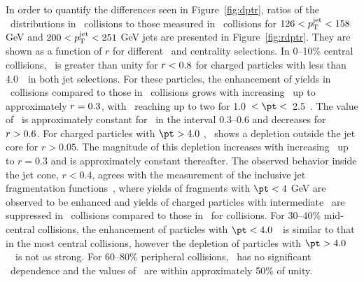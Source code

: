 In order to quantify the differences seen in Figure~\ref{fig:dptr}, ratios of the \Dptr\ distributions in \pbpb\ collisions
to those measured in \pp\ collisions for $126 < \mbox{$p_{\mathrm{T}}^{\mathrm{jet}}$} < 158$ GeV and $200 < \mbox{$p_{\mathrm{T}}^{\mathrm{jet}}$} < 251$ GeV jets 
are presented in Figure~\ref{fig:rdptr}. They are shown as a function of $r$ for different \pt\ and centrality selections. In 0--10\% central collisions,
\RDptr\ is greater than unity for $\mbox{$r$} < 0.8$ for charged particles with \pT less than 4.0~\GeV\ in both jet selections. 
For these particles, the enhancement of yields in \pbpb\ collisions compared to those in  \pp\ 
collisions grows with increasing \rvar\ up to approximately \mbox{$\mbox{$r$}  = 0.3$}, with \RDptr\ reaching up to two for
1.0~$< \pt <$~2.5~\GeV.
The value of \RDptr\ is approximately constant for \rvar\ in the interval \mbox{0.3--0.6} and decreases for \mbox{$\mbox{$r$} > 0.6$}.  For charged particles with $\pt > 4.0$ \GeV, \RDptr\ shows a depletion outside the jet core for $r > 0.05$. The magnitude of this depletion increases with increasing \rvar\ up to $r = 0.3$ and is approximately constant thereafter.
 The observed behavior inside the jet cone, $r < 0.4$, agrees with the measurement of the inclusive jet fragmentation functions~\cite{Aaboud:2017eww,Aaboud:2017bzv, Aaboud:2018hpb}, where yields of fragments with $\pt < 4$ GeV are observed to be enhanced and yields of charged particles with intermediate \pT\ are suppressed in \PbPb\ collisions compared to those in \pp\ for collisions. 
 For 30--40\% mid-central collisions, the enhancement of particles with $\pt < 4.0$~\GeV\ is similar to that in the most central 
 collisions, however the depletion of particles with $\pt > 4.0$~\GeV\ is not as strong.
For 60--80\% peripheral collisions, \RDptr\ has no significant \rvar\ dependence and the values of \RDptr\ are within approximately 50\% of unity.

